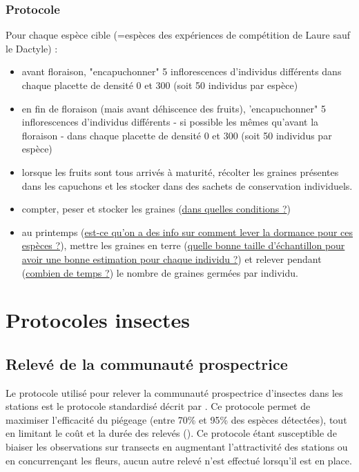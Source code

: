 \documentclass{article}
\begin{document}
	\subsubsection{Protocole}
	Pour chaque espèce cible (=espèces des expériences de compétition de Laure sauf le Dactyle) :
	\begin{itemize}
		\item avant floraison, "encapuchonner" 5 inflorescences d'individus différents dans chaque placette de densité 0 et 300 (soit 50 individus par espèce)
		\item en fin de floraison (mais avant déhiscence des fruits), 'encapuchonner" 5 inflorescences d'individus différents - si possible les mêmes qu'avant la floraison - dans chaque placette de densité 0 et 300 (soit 50 individus par espèce)
		\item lorsque les fruits sont tous arrivés à maturité, récolter les graines présentes dans les capuchons et les stocker dans des sachets de conservation individuels.
		\item compter, peser et stocker les graines (\underline{dans quelles conditions ?})
		\item au printemps (\underline{est-ce qu'on a des info sur comment lever la dormance pour ces espèces ?}), mettre les graines en terre (\underline{quelle bonne taille d'échantillon pour avoir une bonne estimation pour chaque individu ?}) et relever pendant (\underline{combien de temps ?}) le nombre de graines germées par individu.
	\end{itemize}
	\pagebreak
	
	\section{Protocoles insectes}
	
	\subsection{Relevé de la communauté prospectrice}
	Le protocole utilisé pour relever la communauté prospectrice d'insectes dans les stations est le protocole standardisé décrit par \cite{lebuhn_protocol_2016}. Ce protocole permet de maximiser l'efficacité du piégeage (entre 70\% et 95\% des espèces détectées), tout en limitant le coût et la durée des relevés (\cite{westphal_measuring_2008}). Ce protocole étant susceptible de biaiser les observations sur transects en augmentant l'attractivité des stations ou en concurrençant les fleurs, aucun autre relevé n'est effectué lorsqu'il est en place.
\end{document}
